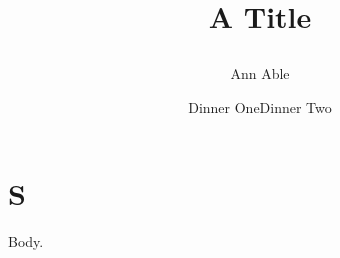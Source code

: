 \documentclass{article}
\begin{document}
\title{A Title \author{Ann Able \date{Dinner One}}}
\date{Dinner Two}
\maketitle
\section{S}
Body.
\end{document}
